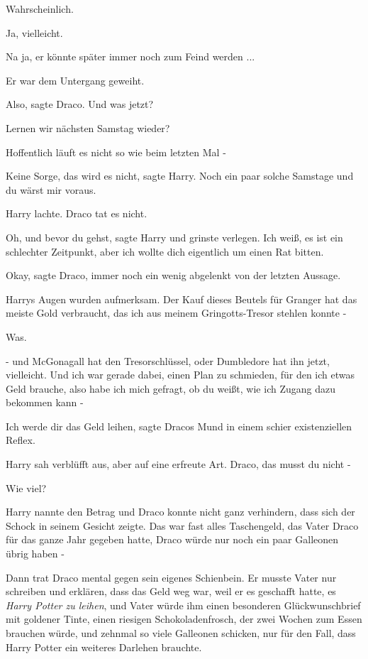 Wahrscheinlich.

Ja, vielleicht.

Na ja, er könnte später immer noch zum Feind werden ...

Er war dem Untergang geweiht.

\glqq{}Also\grqq{}, sagte Draco. \glqq{}Und was jetzt?\grqq{}

\glqq{}Lernen wir nächsten Samstag wieder?\grqq{}

\glqq{}Hoffentlich läuft es nicht so wie beim letzten Mal -\grqq{}

\glqq{}Keine Sorge, das wird es nicht\grqq{}, sagte Harry. \glqq{}Noch ein paar
solche Samstage und du wärst mir voraus.\grqq{}

Harry lachte. Draco tat es nicht.

\glqq{}Oh, und bevor du gehst\grqq{}, sagte Harry und grinste verlegen.
\glqq{}Ich weiß, es ist ein schlechter Zeitpunkt, aber ich wollte dich
eigentlich um einen Rat bitten.\grqq{}

\glqq{}Okay\grqq{}, sagte Draco, immer noch ein wenig abgelenkt von der letzten
Aussage.

Harrys Augen wurden aufmerksam. \glqq{}Der Kauf dieses Beutels für Granger hat
das meiste Gold verbraucht, das ich aus meinem Gringotts-Tresor stehlen konnte
-\grqq{}

Was.

\glqq{}- und McGonagall hat den Tresorschlüssel, oder Dumbledore hat ihn jetzt,
vielleicht. Und ich war gerade dabei, einen Plan zu schmieden, für den ich etwas
Geld brauche, also habe ich mich gefragt, ob du weißt, wie ich Zugang dazu
bekommen kann -\grqq{}

\glqq{}Ich werde dir das Geld leihen\grqq{}, sagte Dracos Mund in einem schier
existenziellen Reflex.

Harry sah verblüfft aus, aber auf eine erfreute Art. \glqq{}Draco, das musst du
nicht -\grqq{}

\glqq{}Wie viel?\grqq{}

Harry nannte den Betrag und Draco konnte nicht ganz verhindern, dass sich der
Schock in seinem Gesicht zeigte. Das war fast alles Taschengeld, das Vater Draco
für das ganze Jahr gegeben hatte, Draco würde nur noch ein paar Galleonen übrig
haben -

Dann trat Draco mental gegen sein eigenes Schienbein. Er musste Vater nur
schreiben und erklären, dass das Geld weg war, weil er es geschafft hatte, es
\emph{Harry Potter zu leihen}, und Vater würde ihm einen besonderen
Glückwunschbrief mit goldener Tinte, einen riesigen Schokoladenfrosch, der zwei
Wochen zum Essen brauchen würde, und zehnmal so viele Galleonen schicken, nur
für den Fall, dass Harry Potter ein weiteres Darlehen brauchte.

